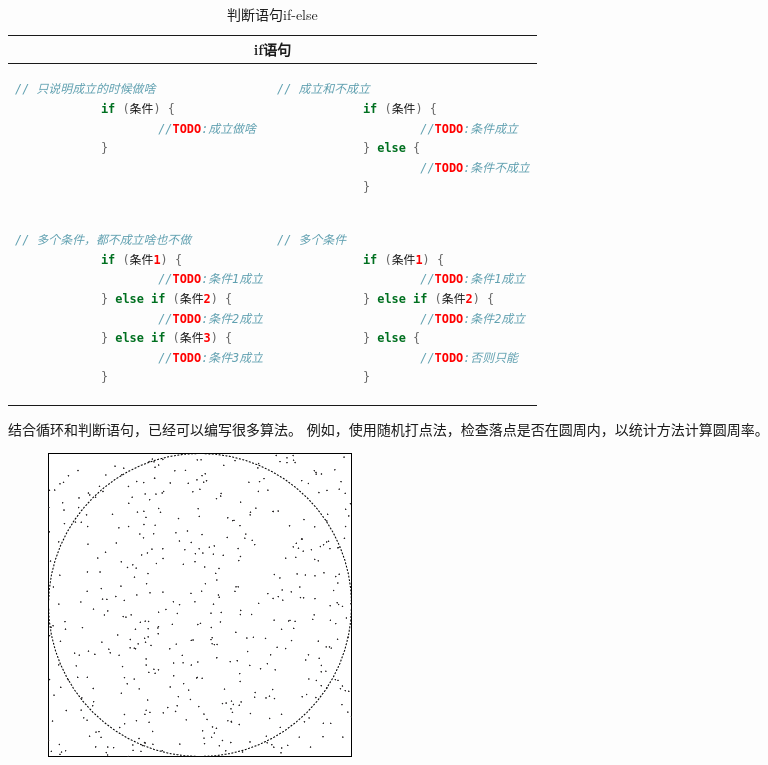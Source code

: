 \begin{table}[!htbp]\centering
	\lstset{frame=none, aboveskip=0mm, belowskip=0mm}
	\begin{tabular}{|p{6.5cm}|p{6.5cm}|}
	\hline
	\multicolumn{2}{|c|}{if语句}\\
	\hline
	\begin{lstlisting}[language=Java]
			// 只说明成立的时候做啥
			if (条件) {
					//TODO:成立做啥
			}
	\end{lstlisting}
	&
	\begin{lstlisting}[language=Java]
			// 成立和不成立
			if (条件) {
					//TODO:条件成立
			} else {
					//TODO:条件不成立
			}
	\end{lstlisting} \\
	\hline
	\begin{lstlisting}[language=Java]
			// 多个条件，都不成立啥也不做
			if (条件1) {
					//TODO:条件1成立
			} else if (条件2) {
					//TODO:条件2成立
			} else if (条件3) {
					//TODO:条件3成立
			}
	\end{lstlisting}
	&
	\begin{lstlisting}[language=Java]
			// 多个条件
			if (条件1) {
					//TODO:条件1成立
			} else if (条件2) {
					//TODO:条件2成立
			} else {
					//TODO:否则只能
			}
	\end{lstlisting} \\
	\hline
	\end{tabular}
	\caption{判断语句if-else}
\end{table}

\bigskip

\begin{example}
	结合循环和判断语句，已经可以编写很多算法。
	例如，使用随机打点法，检查落点是否在圆周内，以统计方法计算圆周率。
\end{example}

\begin{figure}[!htbp]
	\centerline{\includegraphics[scale=0.4]{part1/dot-pi.png}}
\end{figure}

